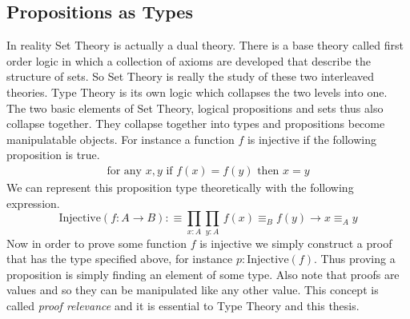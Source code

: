 \documentclass[./Thesis.tex]{subfiles}
\begin{document}
\subsection{Propositions as Types}
In reality Set Theory is actually a dual theory. There is a base theory called
first order logic in which a collection of axioms are developed that describe
the structure of sets. So Set Theory is really the study of these two
interleaved theories. Type Theory is its own logic which collapses the two
levels into one. The two basic elements of Set Theory, logical propositions and
sets thus also collapse together. They collapse together into types and
propositions become manipulatable objects. For instance
a function $f$ is injective if the following proposition is true.
\begin{align}
  \text{for any } x, y \text{ if } f(x) = f(y) \text{ then } x = y
\end{align}
We can represent this proposition type theoretically with the following
expression. 
\begin{equation}
  \label{eqn:injective}
  \text{Injective}(f : A \to B) :\equiv \prod_{x : A} \prod_{y : A} \, f(x) \equiv_B f(y) \to x \equiv_A y
\end{equation}
Now in order to prove some function $f$ is injective we simply construct a proof
that has the type specified above, for instance $p : \text{Injective}(f)$.
Thus proving a proposition is simply finding an element of some type.
Also note that proofs are values and so they can be
manipulated like any other value. This concept is called
\textit{proof relevance} and it is essential to Type Theory and this thesis.
\end{document}
